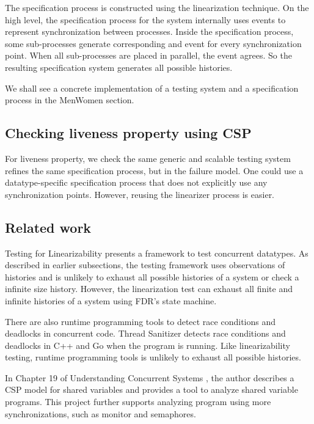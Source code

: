 \documentclass[a4paper, 12pt]{article}
\begin{document}
The specification process is constructed using the linearization technique. On the high level, the specification process for the system internally uses  events to represent synchronization between processes. Inside the specification process, some sub-processes generate corresponding  and  event for every synchronization point. When all sub-processes are placed in parallel, the  event agrees. So the resulting specification system generates all possible histories. 

We shall see a concrete implementation of a testing system and a specification process in the MenWomen section. 

\subsection{Checking liveness property using CSP}
For liveness property, we check the same generic and scalable testing system refines the same specification process, but in the failure model. One could use a datatype-specific specification process that does not explicitly use any synchronization points. However, reusing the linearizer process is easier. 

\subsection{Related work}
Testing for Linearizability \cite{linearizability-testing} presents a framework to test concurrent datatypes. As described in earlier subsections, the testing framework uses observations of histories and is unlikely to exhaust all possible histories of a system or check a infinite size history. However, the linearization test can exhaust all finite and infinite histories of a system using FDR's state machine. 

There are also runtime programming tools to detect race conditions and deadlocks in concurrent code. Thread Sanitizer \cite{threadsanitizer} detects race conditions and deadlocks in C++ and Go when the program is running. Like linearizability testing, runtime programming tools is unlikely to exhaust all possible histories. 

In Chapter 19 of Understanding Concurrent Systems \cite{ucs-book}, the author describes a CSP model for shared variables and provides a tool to analyze shared variable programs. This project further supports analyzing program using more synchronizations, such as monitor and semaphores.
\end{document}
